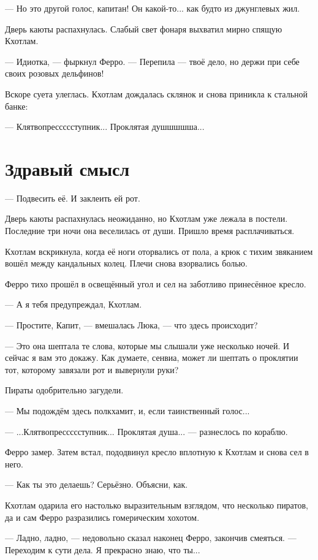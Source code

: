 --- Но это другой голос, капитан!
Он какой-то... как будто из джунглевых жил.

Дверь каюты распахнулась.
Слабый свет фонаря выхватил мирно спящую Кхотлам.

--- Идиотка, --- фыркнул Ферро.
--- Перепила --- твоё дело, но держи при себе своих розовых дельфинов!

Вскоре суета улеглась.
Кхотлам дождалась склянок и снова приникла к стальной банке:

--- Клятвопрессссступник...
Проклятая душшшшша...

\section{Здравый смысл}

--- Подвесить её.
И заклеить ей рот.

Дверь каюты распахнулась неожиданно, но Кхотлам уже лежала в постели.
Последние три ночи она веселилась от души.
Пришло время расплачиваться.

Кхотлам вскрикнула, когда её ноги оторвались от пола, а крюк с тихим звяканием вошёл между кандальных колец.
Плечи снова взорвались болью.

Ферро тихо прошёл в освещённый угол и сел на заботливо принесённое кресло.

--- А я тебя предупреждал, Кхотлам.

--- Простите, Капит, --- вмешалась Люка, --- что здесь происходит?

--- Это она шептала те слова, которые мы слышали уже несколько ночей.
И сейчас я вам это докажу.
Как думаете, сенвиа, может ли шептать о проклятии тот, которому завязали рот и вывернули руки?

Пираты одобрительно загудели.

--- Мы подождём здесь полкхамит, и, если таинственный голос...

--- ...Клятвопрессссступник... Проклятая душа... --- разнеслось по кораблю.

Ферро замер.
Затем встал, пододвинул кресло вплотную к Кхотлам и снова сел в него.

--- Как ты это делаешь?
Серьёзно.
Объясни, как.

Кхотлам одарила его настолько выразительным взглядом, что несколько пиратов, да и сам Ферро разразились гомерическим хохотом.

--- Ладно, ладно, --- недовольно сказал наконец Ферро, закончив смеяться.
--- Переходим к сути дела.
Я прекрасно знаю, что ты...


